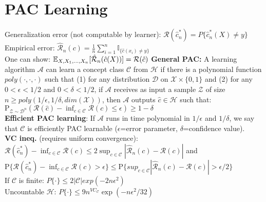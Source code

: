 \section{PAC Learning}

Generalization error (not computable by learner): $\mathcal{R}(\hat{c}_n^*) = P\{ \hat{c}_n^*(X)\neq y \}$ \\
Empirical error: $\hat{\mathcal{R}}_n(c) = \tfrac{1}{n}\sum_{i=1}^n \mathbb{I}_{\{\hat c(x_i)\neq y\}}$ \\
One can show: $\mathbb E_{X,X_1,...,X_n}[\hat{\mathcal{R}}_n(\hat c(X))]=\mathcal{R}(\hat c)$
\textbf{General PAC:} A learning algorithm $\mathcal{A}$ can learn a concept class $\mathcal{C}$ from $\mathcal{H}$ if there is a polynomial function $poly(\cdot,\cdot,\cdot)$ such that (1) for any distribution $\mathcal{D}$ on $\mathcal{X} \times \{0,1\}$ and (2) for any $0<\epsilon<1/2$ and $0<\delta<1/2$, if $\mathcal{A}$ receives as input a sample $\mathcal{Z}$ of size $n\geq poly(1/\epsilon,1/\delta,dim(\mathcal{X}))$, then $\mathcal{A}$ outputs $\hat c \in \mathcal{H}$ such that: $\mathrm{P}_{\mathcal{Z}\sim\mathcal{D}^n}(\mathcal{R}(\hat c)-\inf_{c\in\mathcal{C}}\mathcal{R}(c)\leq\epsilon)\geq 1-\delta$\\
\textbf{Efficient PAC learning}: If $\mathcal{A}$ runs in time polynomial in $1/\epsilon$ and $1/\delta$, we say that $\mathcal{C}$ is efficiently PAC learnable ($\epsilon$=error parameter, $\delta$=confidence value).\\
\textbf{VC ineq.} (requires uniform convergence): $\mathcal{R}(\hat c_n^*)-\inf_{c\in \mathcal{C}} \mathcal{R}(c) \leq 2\sup_{c\in \mathcal{C}}|\hat{\mathcal{R}}_n(c) - \mathcal{R}(c)|$ and
$\mathrm{P}\{\mathcal{R}(\hat c_n^*)-\inf_{c\in \mathcal{C}} \mathcal{R}(c)>\epsilon\} \leq \mathrm{P}\{sup_{c\in \mathcal{C}}|\hat{\mathcal{R}}_n(c) - \mathcal{R}(c)|>\epsilon/2\}$\\
If $\mathcal{C}$ is finite: $P\{\cdot\} \leq 2|\mathcal{C}| exp(-2n\epsilon ^2)$\\
Uncountable $\mathcal{H}$: $P\{\cdot\} \leq 9n^{VC_\mathcal{C}}\exp(-n\epsilon^2/32)$




